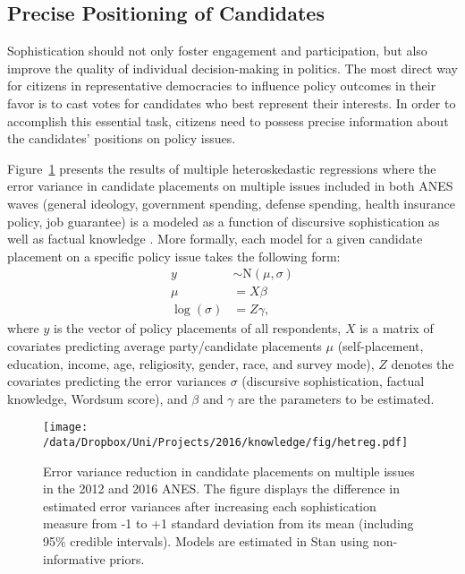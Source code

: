 \subsection{Precise Positioning of Candidates}
Sophistication should not only foster engagement and participation, but also improve the quality of individual decision-making in politics. The most direct way for citizens in representative democracies to influence policy outcomes in their favor is to cast votes for candidates who best represent their interests. In order to accomplish this essential task, citizens need to possess precise information about the candidates' positions on policy issues.

Figure~\ref{fig:hetreg} presents the results of multiple heteroskedastic regressions where the error variance in candidate placements on multiple issues included in both ANES waves (general ideology, government spending, defense spending, health insurance policy, job guarantee) is a modeled as a function of discursive sophistication as well as factual knowledge \citep[see][for a similar procedure]{jacoby2006value}. More formally, each model for a given candidate placement on a specific policy issue takes the following form:
\begin{align}
y &\sim \text{N}(\mu, \sigma) \\
\mu &= X\beta \\
\log(\sigma) &= Z\gamma,
\end{align}
where $y$ is the vector of policy placements of all respondents, $X$ is a matrix of covariates predicting average party/candidate placements $\mu$ (self-placement, education, income, age, religiosity, gender, race, and survey mode), $Z$ denotes the covariates predicting the error variances $\sigma$ (discursive sophistication, factual knowledge, Wordsum score), and $\beta$ and $\gamma$ are the parameters to be estimated.

\begin{figure}[h]\centering
\texttt{[image: /data/Dropbox/Uni/Projects/2016/knowledge/fig/hetreg.pdf]}
\caption{Error variance reduction in candidate placements on multiple issues in the 2012 and 2016 ANES. The figure displays the difference in estimated error variances after increasing each sophistication measure from -1 to +1 standard deviation from its mean (including 95\% credible intervals). Models are estimated in Stan using non-informative priors.}\label{fig:hetreg}
\end{figure}

